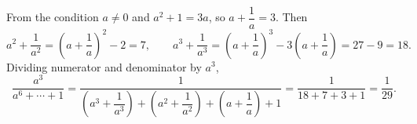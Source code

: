 From the condition $a\ne0$ and $a^2+1=3a$, so $a+\dfrac{1}{a}=3$. Then
\[
a^2+\dfrac{1}{a^2}=\left(a+\dfrac{1}{a}\right)^2-2=7,\qquad a^3+\dfrac{1}{a^3}=\left(a+\dfrac{1}{a}\right)^3-3\left(a+\dfrac{1}{a}\right)=27-9=18 .
\]
Dividing numerator and denominator by $a^3$,
\[
\dfrac{a^3}{a^6+\cdots+1}=\dfrac{1}{\left(a^3+\dfrac{1}{a^3}\right)+\left(a^2+\dfrac{1}{a^2}\right)+\left(a+\dfrac{1}{a}\right)+1}=\dfrac{1}{18+7+3+1}=\boxed{\dfrac{1}{29}}.
\]

